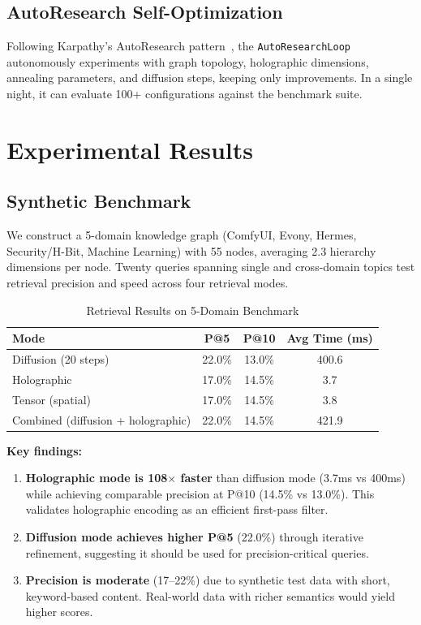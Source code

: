 \documentclass[11pt,a4paper]{article}
\begin{document}
\subsection{AutoResearch Self-Optimization}

Following Karpathy's AutoResearch pattern~\cite{karpathy2026autoresearch}, the \texttt{AutoResearchLoop} autonomously experiments with graph topology, holographic dimensions, annealing parameters, and diffusion steps, keeping only improvements. In a single night, it can evaluate 100+ configurations against the benchmark suite.

\section{Experimental Results}

\subsection{Synthetic Benchmark}

We construct a 5-domain knowledge graph (ComfyUI, Evony, Hermes, Security/H-Bit, Machine Learning) with 55 nodes, averaging 2.3 hierarchy dimensions per node. Twenty queries spanning single and cross-domain topics test retrieval precision and speed across four retrieval modes.

\begin{table}[H]
\centering
\caption{Retrieval Results on 5-Domain Benchmark}
\begin{tabular}{lccc}
\toprule
\textbf{Mode} & \textbf{P@5} & \textbf{P@10} & \textbf{Avg Time (ms)} \\
\midrule
Diffusion (20 steps) & 22.0\% & 13.0\% & 400.6 \\
Holographic & 17.0\% & 14.5\% & 3.7 \\
Tensor (spatial) & 17.0\% & 14.5\% & 3.8 \\
Combined (diffusion + holographic) & 22.0\% & 14.5\% & 421.9 \\
\bottomrule
\end{tabular}
\end{table}

\textbf{Key findings:}

\begin{enumerate}[leftmargin=*,itemsep=0pt]
    \item \textbf{Holographic mode is 108$\times$ faster} than diffusion mode (3.7ms vs 400ms) while achieving comparable precision at P@10 (14.5\% vs 13.0\%). This validates holographic encoding as an efficient first-pass filter.
    \item \textbf{Diffusion mode achieves higher P@5} (22.0\%) through iterative refinement, suggesting it should be used for precision-critical queries.
    \item \textbf{Precision is moderate} (17--22\%) due to synthetic test data with short, keyword-based content. Real-world data with richer semantics would yield higher scores.
\end{enumerate}
\end{document}
